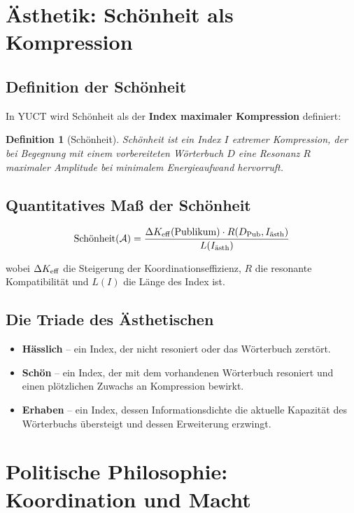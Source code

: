 \documentclass[12pt,a4paper]{article}
\newtheorem{definition}{Definition}[section]
\begin{document}
	\section{Ästhetik: Schönheit als Kompression}
	
	\subsection{Definition der Schönheit}
	
	In YUCT wird Schönheit als der \textbf{Index maximaler Kompression} definiert:
	
	\begin{definition}[Schönheit]
		Schönheit ist ein Index \(I\) extremer Kompression, der bei Begegnung mit einem vorbereiteten Wörterbuch \(D\) eine Resonanz \(R\) maximaler Amplitude bei minimalem Energieaufwand hervorruft.
	\end{definition}
	
	\subsection{Quantitatives Maß der Schönheit}
	
	\begin{equation}
		\text{Schönheit}(\mathcal{A}) = \frac{\Delta \Keff(\text{Publikum}) \cdot R(D_{\text{Pub}}, I_{\text{ästh}})}{L(I_{\text{ästh}})}
	\end{equation}
	
	wobei \(\Delta \Keff\) die Steigerung der Koordinationseffizienz, \(R\) die resonante Kompatibilität und \(L(I)\) die Länge des Index ist.
	
	\subsection{Die Triade des Ästhetischen}
	
	\begin{itemize}
		\item \textbf{Hässlich} – ein Index, der nicht resoniert oder das Wörterbuch zerstört.
		\item \textbf{Schön} – ein Index, der mit dem vorhandenen Wörterbuch resoniert und einen plötzlichen Zuwachs an Kompression bewirkt.
		\item \textbf{Erhaben} – ein Index, dessen Informationsdichte die aktuelle Kapazität des Wörterbuchs übersteigt und dessen Erweiterung erzwingt.
	\end{itemize}
	
	\section{Politische Philosophie: Koordination und Macht}
	
\end{document}
